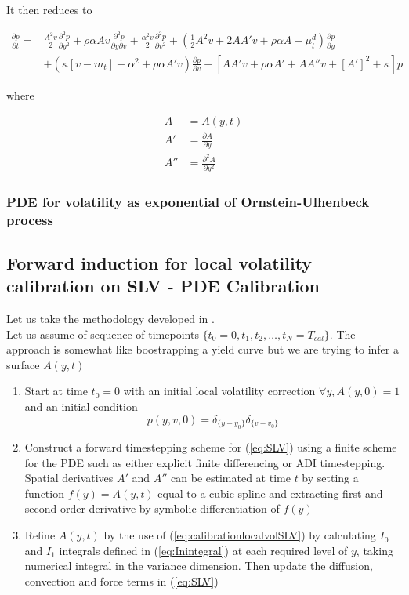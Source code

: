 \documentclass{article}
\begin{document}
\noindent It then reduces to 

\begin{equation}
\label{eq:SLV}
\begin{aligned}
	\frac{\partial p}{\partial t} =
 &\frac{A^2v}{2}\frac{\partial^2 p}{\partial y^2}
 + \rho \alpha A v \frac{\partial^2 p}{\partial y \partial v} 
+ \frac{\alpha^2 v}{2} \frac{\partial^2 p}{\partial v^2} 
+ \left(\frac{1}{2} A^2 v + 2 A A' v + \rho \alpha A - \mu^d_t\right)\frac{\partial p}{\partial y}\\
& + \left(\kappa \left[v - m_t\right] + \alpha^2 + \rho \alpha A' v\right) \frac{\partial p}{\partial v}
+\left[ AA'v + \rho \alpha A' + AA''v + \left[A'\right]^2 + \kappa\right] p
\end{aligned}
\end{equation}

\noindent where 

\begin{equation}
\begin{aligned}
A&= A(y,t)\\
A' &= \frac{\partial A}{\partial y}\\
A'' &= \frac{\partial^2 A}{\partial y^2}
\end{aligned}
\end{equation}

\subsubsection{PDE for volatility as exponential of Ornstein-Ulhenbeck process}
\subsection{Forward induction for local volatility calibration on SLV - PDE Calibration}
Let us take the methodology developed in \cite{Clark2010}.\\
Let us assume of sequence of timepoints $\{t_0 = 0, t_1, t_2, \dots, t_N = T_{cal}\}$. The approach is somewhat like boostrapping a yield curve but we are trying to infer a surface $A(y,t)$

\begin{enumerate}
	\item Start at time $t_0 = 0$ with an initial local volatility correction $\forall y, A(y,0) = 1$ and an initial condition
\begin{equation}
	p(y,v,0) = \delta_{\{y-y_0\}} \delta_{\{v-v_0\}}
\end{equation}
	\item Construct a forward timestepping scheme for (\ref{eq:SLV}) using a finite scheme for the PDE such as either explicit finite differencing or ADI timestepping. Spatial derivatives $A'$ and $A''$ can be estimated at time $t$ by setting a function $f(y) = A(y,t)$ equal to a cubic spline and extracting first and second-order derivative by symbolic differentiation of $f(y)$
	\item Refine $A(y,t)$ by the use of (\ref{eq:calibrationlocalvolSLV}) by calculating $I_0$ and $I_1$ integrals defined in (\ref{eq:Inintegral}) at each required level of $y$, taking numerical integral in the variance dimension. Then update the diffusion, convection and force terms in (\ref{eq:SLV})
\end{enumerate}
\end{document}
